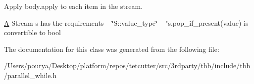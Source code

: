 Apply body.\+apply to each item in the stream. 

\hyperlink{structA}{A} Stream s has the requirements ~\newline
 \char`\"{}\+S\+::value\+\_\+type\char`\"{} ~\newline
 "s.\+pop\+\_\+if\+\_\+present(value) is convertible to bool 

The documentation for this class was generated from the following file\+:\begin{DoxyCompactItemize}
\item 
/\+Users/pourya/\+Desktop/platform/repos/tetcutter/src/3rdparty/tbb/include/tbb/parallel\+\_\+while.\+h\end{DoxyCompactItemize}

